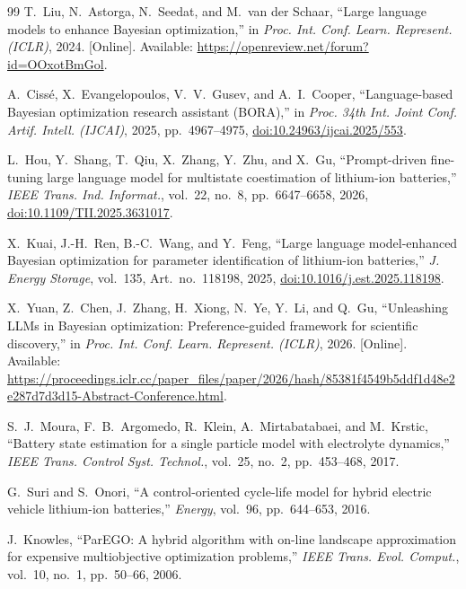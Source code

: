 \documentclass[journal,10pt]{IEEEtran}
\begin{document}
\begin{thebibliography}{99}
T.~Liu, N.~Astorga, N.~Seedat, and M.~van der Schaar,
``Large language models to enhance Bayesian optimization,''
in \textit{Proc. Int. Conf. Learn. Represent. (ICLR)}, 2024.
[Online]. Available:
\url{https://openreview.net/forum?id=OOxotBmGol}.

A.~Ciss\'e, X.~Evangelopoulos, V.~V.~Gusev,
and A.~I.~Cooper,
``Language-based Bayesian optimization research assistant (BORA),''
in \textit{Proc. 34th Int. Joint Conf. Artif. Intell. (IJCAI)},
2025, pp.~4967--4975,
\href{https://doi.org/10.24963/ijcai.2025/553}
{doi:10.24963/ijcai.2025/553}.

L.~Hou, Y.~Shang, T.~Qiu, X.~Zhang, Y.~Zhu, and X.~Gu,
``Prompt-driven fine-tuning large language model for multistate
coestimation of lithium-ion batteries,''
\textit{IEEE Trans. Ind. Informat.},
vol.~22, no.~8, pp.~6647--6658, 2026,
\href{https://doi.org/10.1109/TII.2025.3631017}
{doi:10.1109/TII.2025.3631017}.

X.~Kuai, J.-H.~Ren, B.-C.~Wang, and Y.~Feng,
``Large language model-enhanced Bayesian optimization for
parameter identification of lithium-ion batteries,''
\textit{J. Energy Storage},
vol.~135, Art.~no.~118198, 2025,
\href{https://doi.org/10.1016/j.est.2025.118198}
{doi:10.1016/j.est.2025.118198}.

X.~Yuan, Z.~Chen, J.~Zhang, H.~Xiong,
N.~Ye, Y.~Li, and Q.~Gu,
``Unleashing LLMs in Bayesian optimization:
Preference-guided framework for scientific discovery,''
in \textit{Proc. Int. Conf. Learn. Represent. (ICLR)}, 2026.
[Online]. Available:
\url{https://proceedings.iclr.cc/paper_files/paper/2026/hash/85381f4549b5ddf1d48e2e287d7d3d15-Abstract-Conference.html}.

S.~J.~Moura, F.~B.~Argomedo, R.~Klein,
A.~Mirtabatabaei, and M.~Krstic,
``Battery state estimation for a single particle model
with electrolyte dynamics,''
\textit{IEEE Trans. Control Syst. Technol.},
vol.~25, no.~2, pp.~453--468, 2017.

G.~Suri and S.~Onori,
``A control-oriented cycle-life model for hybrid electric
vehicle lithium-ion batteries,''
\textit{Energy}, vol.~96, pp.~644--653, 2016.

J.~Knowles,
``ParEGO: A hybrid algorithm with on-line landscape approximation
for expensive multiobjective optimization problems,''
\textit{IEEE Trans. Evol. Comput.},
vol.~10, no.~1, pp.~50--66, 2006.


\end{thebibliography}
\end{document}
